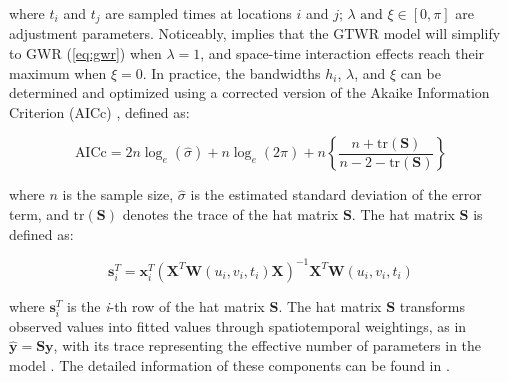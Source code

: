\noindent where $t_i$ and $t_j$ are sampled times at locations $i$ and $j$; \( \lambda \text{ and } \xi \in [0, \pi] \) are adjustment parameters. Noticeably,  implies that the GTWR model will simplify to GWR (\cref{eq:gwr}) when $\lambda=1$, and space-time interaction effects reach their maximum when $\xi=0$. In practice, the bandwidths $h_i$, $\lambda$, and $\xi$ can be determined and optimized using a corrected version of the Akaike Information Criterion (AICc) \citep{Hurvich2002_AICc}, defined as:

\begin{equation}
	\text{AICc} = 2n \log_e (\hat{\sigma}) + n \log_e (2\pi) + n \left\{ \frac{n + \text{tr}(\mathbf{S})}{n - 2 - \text{tr}(\mathbf{S})} \right\}
\label{eq:aicc}
\end{equation}

\noindent where \(n\) is the sample size, \(\hat{\sigma}\) is the estimated standard deviation of the error term, and \(\text{tr}(\mathbf{S})\) denotes the trace of the hat matrix $\mathbf{S}$. The hat matrix $\mathbf{S}$ is defined as:

\begin{equation}
	\mathbf{s}_i^T = \mathbf{x}_i^T(\mathbf{X}^T \mathbf{W}(u_i, v_i, t_i) \mathbf{X})^{-1}\mathbf{X}^T \mathbf{W}(u_i, v_i, t_i)
	\label{eq:hat_matrix_row}
\end{equation}

\noindent where $\mathbf{s}_i^T$ is the \textit{i}-th row of the hat matrix $\mathbf{S}$.
%
%
The hat matrix $\mathbf{S}$ transforms observed values into fitted values through spatiotemporal weightings, as in $\hat{\mathbf{y}} = \mathbf{S}\mathbf{y}$, with its trace representing the effective number of parameters in the model \citep{hat_matrix}. The detailed information of these components can be found in \citet{fotheringham2002geographically}.


